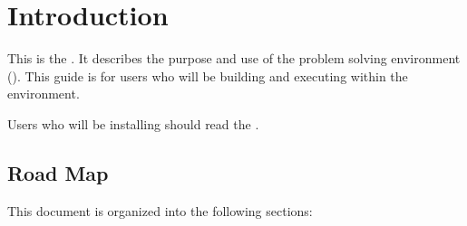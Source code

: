 %
%
%
%
%

%

\section{Introduction}
\label{sec:intro}


This is the \etitle{\srug}.  It describes the purpose and use of the
\sr{} problem solving environment (\pse).  This guide is for users who
will be building and executing  within the \sr{}
environment.

Users who will be installing \sr{} should read the
.




\subsection{Road Map}
\label{sec:roadmap}

This document is organized into the following sections:

